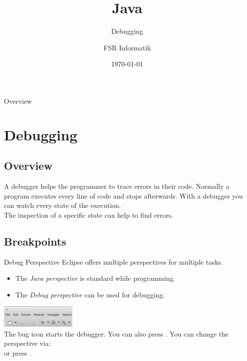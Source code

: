 

\title{Java}
\subtitle{Debugging}
\author{FSR Informatik}
\date{\today}



\begin{frame}
\titlepage
\end{frame}
\begin{frame}{Overview}
\tableofcontents
\end{frame}

\section{Debugging}
\subsection{Overview}
\begin{frame}{}
	A debugger helps the programmer to trace errors in their code.
	\vfill
	Normally a program executes every line of code and stops afterwards.
	With a debugger you can watch every state of the execution.\\
	
	The inspection of a specific state can help to find errors.
\end{frame}

\subsection{Breakpoints}
\begin{frame}{Debug Perspective}
	Eclipse offers multiple perspectives for multiple tasks.
	\begin{itemize}
		\item The \emph{Java perspective} is standard while programming.
		\item The \emph{Debug perspective} can be used for debugging.
	\end{itemize}
	\vfill
	\includegraphics[width=10em]{res/debug_start.png} \\
	The bug icon starts the debugger. You can also press .
	\vfill
	You can change the perspective via:
	 \\
	or press .
\end{frame}

